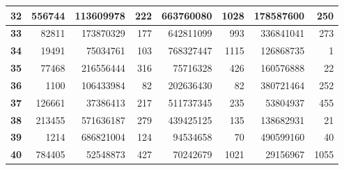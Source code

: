 \documentclass[12pt]{article}
\begin{document}
\begin{table}[!htbp]
{\begin{tabular}{crrrrrrr}
\multicolumn{1}{|c|}{\textbf{32}} & \multicolumn{1}{r|}{556744} & \multicolumn{1}{r|}{113609978} & \multicolumn{1}{r|}{222} & \multicolumn{1}{r|}{663760080} & \multicolumn{1}{r|}{1028} & \multicolumn{1}{r|}{178587600} & \multicolumn{1}{r|}{250} \\ \hline
\multicolumn{1}{|c|}{\textbf{33}} & \multicolumn{1}{r|}{82811} & \multicolumn{1}{r|}{173870329} & \multicolumn{1}{r|}{177} & \multicolumn{1}{r|}{642811099} & \multicolumn{1}{r|}{993} & \multicolumn{1}{r|}{336841041} & \multicolumn{1}{r|}{273} \\ \hline
\multicolumn{1}{|c|}{\textbf{34}} & \multicolumn{1}{r|}{19491} & \multicolumn{1}{r|}{75034761} & \multicolumn{1}{r|}{103} & \multicolumn{1}{r|}{768327447} & \multicolumn{1}{r|}{1115} & \multicolumn{1}{r|}{126868735} & \multicolumn{1}{r|}{1} \\ \hline
\multicolumn{1}{|c|}{\textbf{35}} & \multicolumn{1}{r|}{77468} & \multicolumn{1}{r|}{216556444} & \multicolumn{1}{r|}{316} & \multicolumn{1}{r|}{75716328} & \multicolumn{1}{r|}{426} & \multicolumn{1}{r|}{160576888} & \multicolumn{1}{r|}{22} \\ \hline
\multicolumn{1}{|c|}{\textbf{36}} & \multicolumn{1}{r|}{1100} & \multicolumn{1}{r|}{106433984} & \multicolumn{1}{r|}{82} & \multicolumn{1}{r|}{202636430} & \multicolumn{1}{r|}{82} & \multicolumn{1}{r|}{380721464} & \multicolumn{1}{r|}{252} \\ \hline
\multicolumn{1}{|c|}{\textbf{37}} & \multicolumn{1}{r|}{126661} & \multicolumn{1}{r|}{37386413} & \multicolumn{1}{r|}{217} & \multicolumn{1}{r|}{511737345} & \multicolumn{1}{r|}{235} & \multicolumn{1}{r|}{53804937} & \multicolumn{1}{r|}{455} \\ \hline
\multicolumn{1}{|c|}{\textbf{38}} & \multicolumn{1}{r|}{213455} & \multicolumn{1}{r|}{571636187} & \multicolumn{1}{r|}{279} & \multicolumn{1}{r|}{439425125} & \multicolumn{1}{r|}{135} & \multicolumn{1}{r|}{138682931} & \multicolumn{1}{r|}{21} \\ \hline
\multicolumn{1}{|c|}{\textbf{39}} & \multicolumn{1}{r|}{1214} & \multicolumn{1}{r|}{686821004} & \multicolumn{1}{r|}{124} & \multicolumn{1}{r|}{94534658} & \multicolumn{1}{r|}{70} & \multicolumn{1}{r|}{490599160} & \multicolumn{1}{r|}{40} \\ \hline
\multicolumn{1}{|c|}{\textbf{40}} & \multicolumn{1}{r|}{784405} & \multicolumn{1}{r|}{52548873} & \multicolumn{1}{r|}{427} & \multicolumn{1}{r|}{70242679} & \multicolumn{1}{r|}{1021} & \multicolumn{1}{r|}{29156967} & \multicolumn{1}{r|}{1055} \\ \hline

\end{tabular}}
\end{table}
\end{document}
